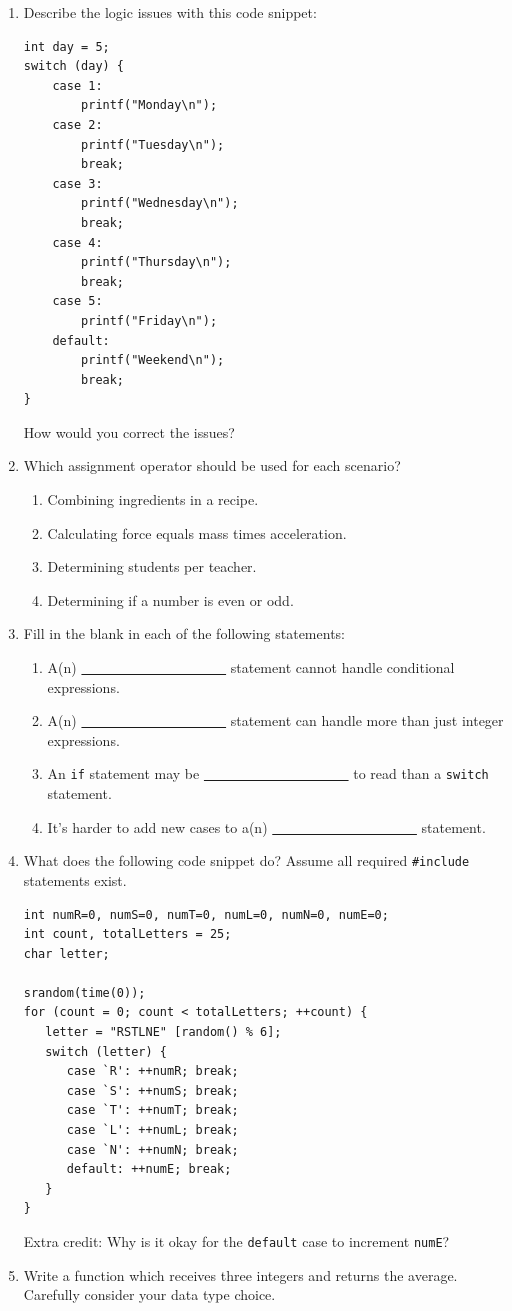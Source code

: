 \documentclass[letter,11pt]{article}
\begin{document}
\begin{enumerate}
    \item Describe the logic issues with this code snippet:
    \begin{verbatim}
int day = 5;
switch (day) {
    case 1:
        printf("Monday\n");
    case 2:
        printf("Tuesday\n");
        break;
    case 3:
        printf("Wednesday\n");
        break;
    case 4:
        printf("Thursday\n");
        break;
    case 5:
        printf("Friday\n");
    default:
        printf("Weekend\n");
        break;
}
    \end{verbatim}
    How would you correct the issues?
    
    \item Which assignment operator should be used for each scenario?
    \begin{enumerate}
        \item Combining ingredients in a recipe.
        \item Calculating force equals mass times acceleration.
        \item Determining students per teacher.
        \item Determining if a number is even or odd.
    \end{enumerate}
    
    \item Fill in the blank in each of the following statements:
    \begin{enumerate}
        \item A(n) \underline{~~ ~~ ~~ ~~ ~~ ~~ ~~ ~~} statement cannot handle conditional expressions.
        \item A(n) \underline{~~ ~~ ~~ ~~ ~~ ~~ ~~ ~~} statement can handle more than just integer expressions.
        \item An \texttt{if} statement may be \underline{~~ ~~ ~~ ~~ ~~ ~~ ~~ ~~} to read than a \texttt{switch} statement.
        \item It's harder to add new cases to a(n) \underline{~~ ~~ ~~ ~~ ~~ ~~ ~~ ~~} statement.
    \end{enumerate}
    
    \item What does the following code snippet do? Assume all required \texttt{\#include} statements exist.
    \begin{verbatim}
int numR=0, numS=0, numT=0, numL=0, numN=0, numE=0;
int count, totalLetters = 25;
char letter;

srandom(time(0));
for (count = 0; count < totalLetters; ++count) {
   letter = "RSTLNE" [random() % 6];
   switch (letter) {
      case `R': ++numR; break;
      case `S': ++numS; break;
      case `T': ++numT; break;
      case `L': ++numL; break;
      case `N': ++numN; break;
      default: ++numE; break;
   }
}
    \end{verbatim}
    Extra credit: Why is it okay for the \texttt{default} case to increment \texttt{numE}?
    
    \item Write a function which receives three integers and returns the average. Carefully consider your data type choice.
\end{enumerate}
\end{document}
